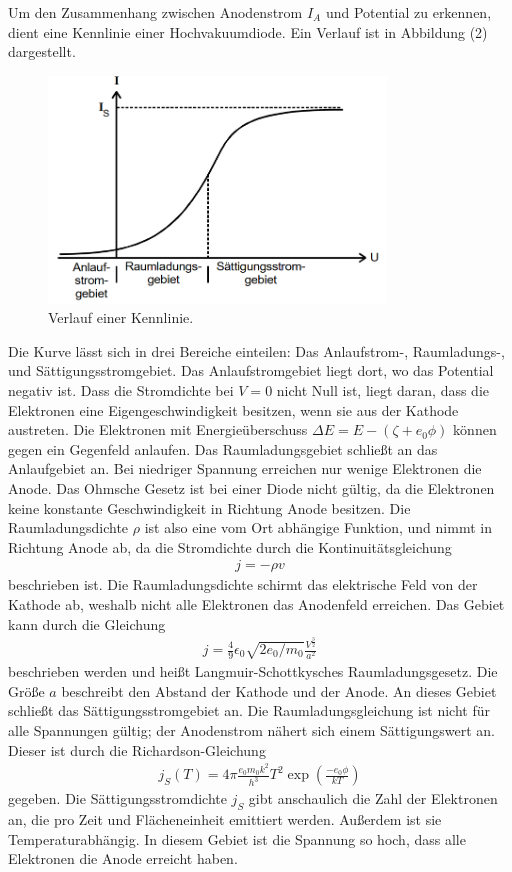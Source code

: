 Um den Zusammenhang zwischen Anodenstrom $I_A$ und Potential zu erkennen, dient eine Kennlinie einer Hochvakuumdiode. Ein Verlauf ist in Abbildung (2) dargestellt.
\begin{figure}[H]
  \centering
  \includegraphics[width=0.8\textwidth]{k.png}
  \caption{Verlauf einer Kennlinie\cite{kent}.}
  \label{fig:aufbau}
\end{figure}
Die Kurve lässt sich in drei Bereiche einteilen: Das Anlaufstrom-, Raumladungs-, und Sättigungsstromgebiet. Das Anlaufstromgebiet liegt dort, wo das Potential negativ ist.
Dass die Stromdichte bei $V=0$ nicht Null ist, liegt daran, dass die Elektronen eine Eigengeschwindigkeit besitzen, wenn sie aus der Kathode austreten. Die Elektronen mit Energieüberschuss $\Delta E = E - ( \zeta + e_0 \phi)$ können gegen ein Gegenfeld anlaufen.
Das Raumladungsgebiet schließt an das Anlaufgebiet an. Bei niedriger Spannung erreichen nur wenige Elektronen die Anode. Das Ohmsche Gesetz ist bei einer Diode nicht gültig, da die Elektronen keine konstante Geschwindigkeit in Richtung Anode besitzen. Die Raumladungsdichte $\rho$ ist also eine vom Ort abhängige Funktion, und nimmt in Richtung Anode ab, da die Stromdichte durch die Kontinuitätsgleichung
\begin{align}
j = -\rho v
\end{align}
beschrieben ist.
Die Raumladungsdichte schirmt das elektrische Feld von der Kathode ab, weshalb nicht alle Elektronen das Anodenfeld erreichen. Das Gebiet kann durch die Gleichung
\begin{align}
j = \frac{4}{9} \epsilon_0 \sqrt{2 e_0/m_0}\frac{V^\frac{3}{2}}{a^2}
\end{align}
beschrieben werden und heißt Langmuir-Schottkysches Raumladungsgesetz. Die Größe $a$ beschreibt den Abstand der Kathode und der Anode.
An dieses Gebiet schließt das Sättigungsstromgebiet an. Die Raumladungsgleichung ist nicht für alle Spannungen gültig; der Anodenstrom nähert sich einem Sättigungswert an. Dieser ist durch die Richardson-Gleichung
\begin{align}
j_S(T) = 4 \pi \frac{e_0 m_0 k^2}{h^3}T^2 \exp(\frac{-e_0 \phi}{k T})
\end{align}
gegeben. Die Sättigungsstromdichte $j_S$ gibt anschaulich die Zahl der Elektronen an, die pro Zeit und Flächeneinheit emittiert werden. Außerdem ist sie Temperaturabhängig. In diesem Gebiet ist die Spannung so hoch, dass alle Elektronen die Anode erreicht haben.

